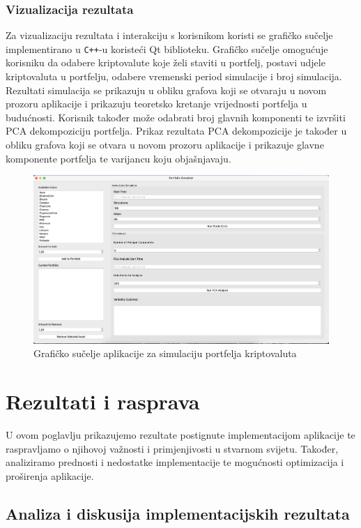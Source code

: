 \documentclass[zavrsnirad, upload]{fer}
\begin{document}
\subsection{Vizualizacija rezultata}
\label{sek:vizualizacija_rezultata}
Za vizualizaciju rezultata i interakciju s korisnikom koristi se
grafičko sučelje implementirano u \texttt{C++}-u koristeći Qt biblioteku.
Grafičko sučelje omogućuje korisniku da odabere kriptovalute koje želi
staviti u portfelj, postavi udjele kriptovaluta u portfelju,
odabere vremenski period simulacije i broj simulacija.
Rezultati simulacija se prikazuju u obliku grafova koji
se otvaraju u novom prozoru aplikacije i prikazuju teoretsko kretanje
vrijednosti portfelja u budućnosti. Korisnik također može odabrati
broj glavnih komponenti te izvršiti PCA dekompoziciju portfelja. Prikaz
rezultata PCA dekompozicije je također u obliku grafova koji
se otvara u novom prozoru aplikacije i prikazuje glavne komponente
portfelja te varijancu koju objašnjavaju.
\begin{figure}[H]
    \centering
    \includegraphics[width=1.0\textwidth]{Figures/gui.png}
    \caption{Grafičko sučelje aplikacije za simulaciju portfelja kriptovaluta}
    \label{fig:portfolio_gui}
\end{figure}

\chapter{Rezultati i rasprava}
\label{pog:rezultati_i_rasprava}
U ovom poglavlju prikazujemo rezultate postignute implementacijom aplikacije
te raspravljamo o njihovoj važnosti i primjenjivosti u stvarnom svijetu.
Također, analiziramo prednosti i nedostatke implementacije te mogućnosti
optimizacija i proširenja aplikacije.
\section{Analiza i diskusija implementacijskih rezultata}
\label{sek:implementacijski_rezultati}
\end{document}
